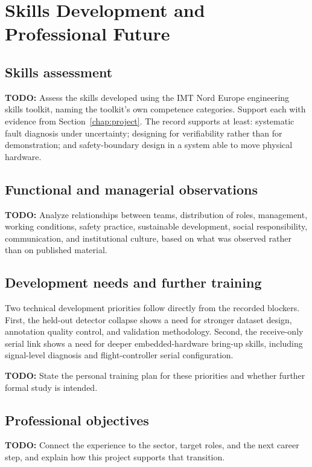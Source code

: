 \documentclass[a4paper,12pt,oneside,openany]{report}
\newcommand{\ReportTodo}[1]{\textbf{TODO:} #1}
\begin{document}
\chapter{Skills Development and Professional Future}
\label{chap:skills-career}

\section{Skills assessment}
\ReportTodo{Assess the skills developed using the IMT Nord Europe engineering skills toolkit, naming
the toolkit's own competence categories. Support each with evidence from
Section~\ref{chap:project}. The record supports at least: systematic fault diagnosis under
uncertainty; designing for verifiability rather than for demonstration; and safety-boundary design
in a system able to move physical hardware.}

\section{Functional and managerial observations}
\ReportTodo{Analyze relationships between teams, distribution of roles, management, working
conditions, safety practice, sustainable development, social responsibility, communication, and
institutional culture, based on what was observed rather than on published material.}

\section{Development needs and further training}
Two technical development priorities follow directly from the recorded blockers. First, the
held-out detector collapse shows a need for stronger dataset design, annotation quality control,
and validation methodology. Second, the receive-only serial link shows a need for deeper
embedded-hardware bring-up skills, including signal-level diagnosis and flight-controller serial
configuration.

\ReportTodo{State the personal training plan for these priorities and whether further formal study
is intended.}

\section{Professional objectives}
\ReportTodo{Connect the experience to the sector, target roles, and the next career step, and
explain how this project supports that transition.}
\end{document}
